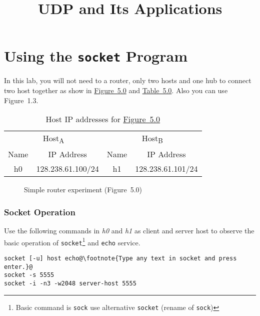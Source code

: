\documentclass{../UTNetLab}
\title{UDP and Its Applications}
\begin{document}
\part{Using the \texttt{socket} Program}
\label{sec:schema}
    In this lab, you will not need to a router, only two hosts and one hub to connect two host together as show in \hyperref[fig:5.0]{Figure~5.0} and \hyperref[tab:5.0]{Table~5.0}.
    Also you can use Figure~1.3.
    \begin{table}[H]
        \caption{Host IP addresses for \hyperref[fig:5.0]{Figure~5.0}}
        \label{tab:5.0}
        \centering
        \begin{tabular}{ *2c|*2c }
            \hline \hline
            \multicolumn{2}{c|}{Host\textsubscript{A}} & \multicolumn{2}{c}{Host\textsubscript{B}} \\
            Name & IP Address & Name & IP Address \\
            \hline 
            h0 & 128.238.61.100/24 & h1 & 128.238.61.101/24\\
            \hline \hline
            \end{tabular}
    \end{table}

    \begin{figure}[H]
        \centering
        \caption{Simple router experiment (Figure~5.0)}        
        \label{fig:5.0}
    \end{figure}

\section{Socket Operation}
    Use the following commands in \textit{h0} and \textit{h1} as client and server host to observe the basic operation of \lstinline{socket}\footnote{Basic command is \lstinline{sock} use alternative \lstinline{socket} (rename of \lstinline{sock})} and \lstinline{echo} service.
    \begin{lstlisting}[emph={host, server-host},morekeywords={[3]echo}]
socket [-u] host echo@\footnote{Type any text in socket and press enter.}@
socket -s 5555
socket -i -n3 -w2048 server-host 5555
    \end{lstlisting}
\end{document}
